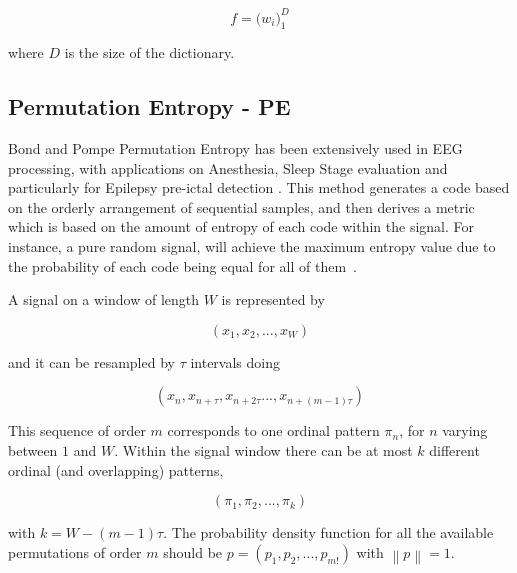 \documentclass[brainsci,article,submit,moreauthors,pdftex,10pt,a4paper]{mdpi}
\begin{document}
\begin{equation}
f =  {\bigg ( w_{i} \bigg )}_{1}^{D} 
\label{eq:multiclassificationrow}
\end{equation}

\noindent where $D$ is the size of the dictionary.




\subsection{Permutation Entropy - PE}

Bond and Pompe Permutation Entropy has been extensively used in EEG processing, with applications on Anesthesia, Sleep Stage evaluation and particularly for Epilepsy pre-ictal detection \citep{Bandt2002}.  This method generates a code based on the orderly arrangement of sequential samples, and then derives a metric which is based on the amount of entropy of each code within the signal.   For instance, a pure random signal, will achieve the maximum entropy value due to the probability of each code being equal for all of them~\citep{Nicolaou2010}.

A signal on a window of length $W$ is represented by 

\begin{equation}
(x_1,x_2,...,x_{W})
\label{eq:pesignal}
\end{equation}

and it can be resampled by $\tau$ intervals doing

\begin{equation}
(x_n,x_{n+\tau},x_{n+2 \tau}...,x_{n+(m-1)\tau})
\label{eq:pesignal}
\end{equation}

This sequence of order $m$ corresponds to one ordinal pattern $\pi_{n}$, for $n$ varying between $1$ and $W$.  Within the signal window there can be at most $k$ different ordinal (and overlapping) patterns,

\begin{equation}
(\pi_{1},\pi_{2},...,\pi_{k})
\label{eq:pesignal}
\end{equation}

\noindent with $k = W-(m-1) \tau$.  The probability density function for all the available permutations of order $m$ should be $ p = (p_1,p_2,...,p_{m!}) $ with $ \left\lVert p \right\lVert = 1 $.
\end{document}
